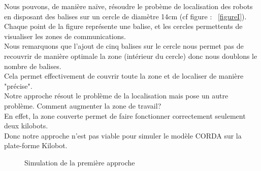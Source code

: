 \documentclass[a4paper,8pt]{report}
\begin{document}
Nous pouvons, de mani\`ere na\"{i}ve, r\'esoudre le prob\`eme de localisation des robots en disposant des balises sur un cercle de diam\`etre 14cm (cf figure : ~\ref{figureI}).\\
Chaque point de la figure repr\'esente une balise, et les cercles permettents de visualiser les zones de communications.\\
Nous remarquons que l'ajout de cinq balises sur le cercle nous permet pas de recouvrir de mani\`ere optimale la zone (int\'erieur du cercle) donc nous doublons le nombre de balises.\\
Cela permet effectivement de couvrir toute la zone et de localiser de mani\`ere "pr\'ecise".\\
Notre approche r\'esout le probl\`eme de la localisation mais pose un autre probl\`eme. Comment augmenter la zone de travail?\\
En effet, la zone couverte permet de faire fonctionner correctement seulement deux kilobots.\\
Donc notre approche n'est pas viable pour simuler le mod\`ele CORDA sur la plate-forme Kilobot.\\

\begin{figure}[!h]
    \centering
    \caption{Simulation de la première approche}
\end{figure}
\end{document}
